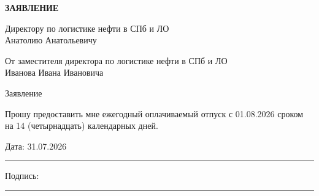 \documentclass[12pt]{article}
\begin{document}
\begin{center}
\textbf{\LARGE ЗАЯВЛЕНИЕ}
\end{center}

\vspace{1cm}




\noindent
Директору по логистике нефти в СПб и ЛО \\
\noindent
Анатолию Анатольевичу \\

\vspace{0.5cm}

\noindent
От заместителя директора по логистике нефти в СПб и ЛО \\
\noindent
Иванова Ивана Ивановича \\

\vspace{0.5cm}

\noindent
Заявление \\

\vspace{0.3cm}

\noindent
Прошу предоставить мне ежегодный оплачиваемый отпуск с 01.08.2026 сроком на 14 (четырнадцать) календарных дней.

\vfill

\noindent
Дата: 31.07.2026 \rule{5cm}{0.4pt} \hfill Подпись: \rule{5cm}{0.4pt}
\end{document}
